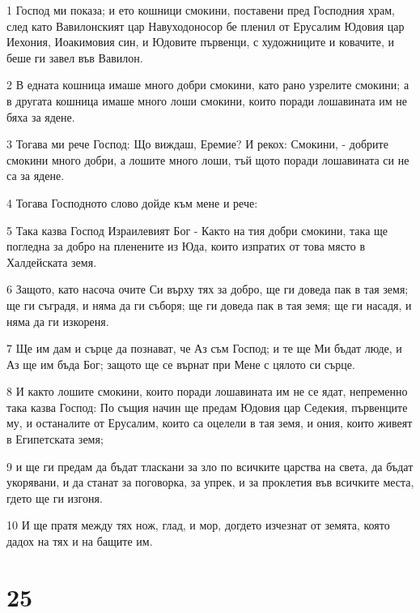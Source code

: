 \par 1 Господ ми показа; и ето кошници смокини, поставени пред Господния храм, след като Вавилонският цар Навуходоносор бе пленил от Ерусалим Юдовия цар Иехония, Иоакимовия син, и Юдовите първенци, с художниците и ковачите, и беше ги завел във Вавилон.
\par 2 В едната кошница имаше много добри смокини, като рано узрелите смокини; а в другата кошница имаше много лоши смокини, които поради лошавината им не бяха за ядене.
\par 3 Тогава ми рече Господ: Що виждаш, Еремие? И рекох: Смокини, - добрите смокини много добри, а лошите много лоши, тъй щото поради лошавината си не са за ядене.
\par 4 Тогава Господното слово дойде към мене и рече:
\par 5 Така казва Господ Израилевият Бог - Както на тия добри смокини, така ще погледна за добро на пленените из Юда, които изпратих от това място в Халдейската земя.
\par 6 Защото, като насоча очите Си върху тях за добро, ще ги доведа пак в тая земя; ще ги съградя, и няма да ги съборя; ще ги доведа пак в тая земя; ще ги насадя, и няма да ги изкореня.
\par 7 Ще им дам и сърце да познават, че Аз съм Господ; и те ще Ми бъдат люде, и Аз ще им бъда Бог; защото ще се върнат при Мене с цялото си сърце.
\par 8 И както лошите смокини, които поради лошавината им не се ядат, непременно така казва Господ: По същия начин ще предам Юдовия цар Седекия, първенците му, и останалите от Ерусалим, които са оцелели в тая земя, и ония, които живеят в Египетската земя;
\par 9 и ще ги предам да бъдат тласкани за зло по всичките царства на света, да бъдат укорявани, и да станат за поговорка, за упрек, и за проклетия във всичките места, гдето ще ги изгоня.
\par 10 И ще пратя между тях нож, глад, и мор, догдето изчезнат от земята, която дадох на тях и на бащите им.

\chapter{25}

